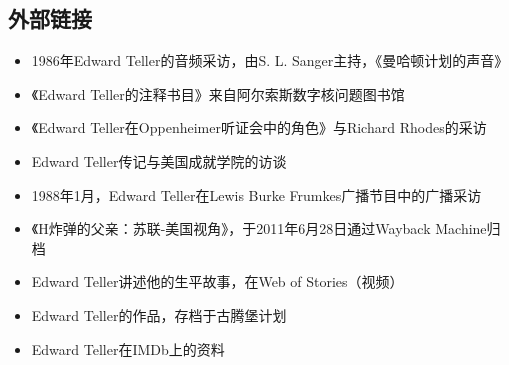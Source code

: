 \subsection{外部链接}
\begin{itemize}
\item 1986年Edward Teller的音频采访，由S. L. Sanger主持，《曼哈顿计划的声音》
\item 《Edward Teller的注释书目》来自阿尔索斯数字核问题图书馆
\item 《Edward Teller在Oppenheimer听证会中的角色》与Richard Rhodes的采访
\item Edward Teller传记与美国成就学院的访谈
\item 1988年1月，Edward Teller在Lewis Burke Frumkes广播节目中的广播采访
\item 《H炸弹的父亲：苏联-美国视角》，于2011年6月28日通过Wayback Machine归档
\item Edward Teller讲述他的生平故事，在Web of Stories（视频）
\item Edward Teller的作品，存档于古腾堡计划
\item Edward Teller在IMDb上的资料
\end{itemize}